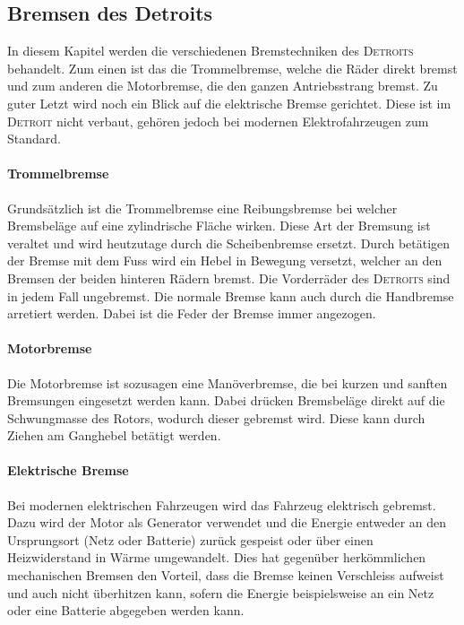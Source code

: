 \subsection{Bremsen des Detroits}\label{bremse}

In diesem Kapitel werden die verschiedenen Bremstechniken des \textsc{Detroits} behandelt. Zum einen ist das die Trommelbremse, welche die Räder direkt bremst und zum anderen die Motorbremse, die den ganzen Antriebsstrang bremst. Zu guter Letzt wird noch ein Blick auf die elektrische Bremse gerichtet. Diese ist im \textsc{Detroit} nicht verbaut, gehören jedoch bei modernen Elektrofahrzeugen zum Standard.

\paragraph{Trommelbremse}

Grundsätzlich ist die Trommelbremse eine Reibungsbremse bei welcher Bremsbeläge auf eine zylindrische Fläche wirken. Diese Art der Bremsung ist veraltet und wird heutzutage durch die Scheibenbremse ersetzt. Durch betätigen der Bremse mit dem Fuss wird ein Hebel in Bewegung versetzt, welcher an den Bremsen der beiden hinteren Rädern bremst. Die Vorderräder des \textsc{Detroits} sind in jedem Fall ungebremst. Die normale Bremse kann auch durch die Handbremse arretiert werden. Dabei ist die Feder der Bremse immer angezogen.

\paragraph{Motorbremse}

Die Motorbremse ist sozusagen eine Manöverbremse, die bei kurzen und sanften Bremsungen eingesetzt werden kann. Dabei drücken Bremsbeläge direkt auf die Schwungmasse des Rotors, wodurch dieser gebremst wird. Diese kann durch Ziehen am Ganghebel betätigt werden.

\paragraph{Elektrische Bremse}
Bei modernen elektrischen Fahrzeugen wird das Fahrzeug elektrisch gebremst. Dazu wird der Motor als Generator verwendet und die Energie entweder an den Ursprungsort (Netz oder Batterie) zurück gespeist oder über einen Heizwiderstand in Wärme umgewandelt. Dies hat gegenüber herkömmlichen mechanischen Bremsen den Vorteil, dass die Bremse keinen Verschleiss aufweist und auch nicht überhitzen kann, sofern die Energie beispielsweise an ein Netz oder eine Batterie abgegeben werden kann.

